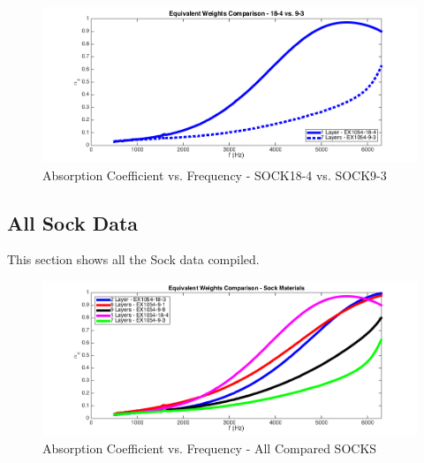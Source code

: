 \begin{figure}[hbtp]
    \centering
    \includegraphics[width=1\textwidth]{Chapter-4/figs/AfigSOCK18-4compareSOCK9-3}
    \caption{Absorption Coefficient vs. Frequency - SOCK18-4 vs. SOCK9-3}
    \label{fig:AfigSOCK18-4compareSOCK9-3}
\end{figure}
\clearpage

\subsection{All Sock Data}
This section shows all the Sock data compiled.

\begin{figure}[hbtp]
    \centering
    \includegraphics[width=1\textwidth]{Chapter-4/figs/AfigSOCKScompared}
    \caption{Absorption Coefficient vs. Frequency - All Compared SOCKS}
    \label{fig:AfigSOCKScompared}
\end{figure}
\clearpage

